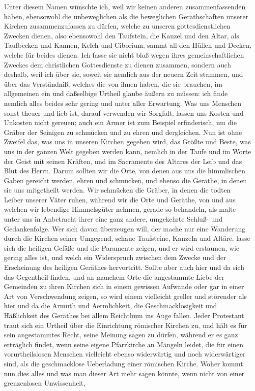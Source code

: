 Unter diesem Namen wünschte ich, weil wir keinen anderen zusammenfassenden haben, ebensowohl die unbeweglichen als die beweglichen Geräthschaften unserer Kirchen zusammenzufassen zu dürfen, welche zu unseren gottesdienstlichen Zwecken dienen, also ebensowohl den Taufstein, die Kanzel und den Altar, als Taufbecken und Kannen, Kelch und Ciborium, sammt all den Hüllen und Decken, welche für beides dienen. Ich fasse sie nicht bloß wegen ihres gemeinschaftlichen Zweckes dem christlichen Gottesdienste zu dienen zusammen, sondern auch deshalb, weil ich über sie, soweit sie nemlich aus der neuern Zeit stammen, und über das Verständniß, welches die von ihnen haben, die sie brauchen, im allgemeinen ein und daßselbige Urtheil glaube äußern zu müssen: ich finde nemlich alles beides sehr gering und unter aller Erwartung. Was uns Menschen sonst theuer und lieb ist, darauf verwenden wir Sorgfalt, lassen uns Kosten und Unkosten nicht gereuen; auch ein Armer ist zum Beispiel erfinderisch, um die Gräber der Seinigen zu schmücken und zu ehren und dergleichen. Nun ist ohne Zweifel das, was uns in unseren Kirchen gegeben wird, das Größte und Beste, was uns in der ganzen Welt gegeben werden kann, nemlich in der Taufe und im Worte der Geist mit seinen Kräften, und im Sacramente des Altares der Leib und das Blut des Herrn. Darum sollten wir die Orte, von denen aus uns die himmlischen Gaben gereicht werden, ehren
und schmücken, und ebenso die Geräthe, in denen sie uns mitgetheilt werden. Wir schmücken die Gräber, in denen die todten Leiber unserer Väter ruhen, während wir die Orte und Geräthe, von und aus welchen wir lebendige Himmelsgüter nehmen, gerade so behandeln, als malte unter uns in Anbetracht ihrer eine ganz andere, umgekehrte Schluß- und Gedankenfolge. Wer sich davon überzeugen will, der mache nur eine Wanderung durch die Kirchen seiner Umgegend, schaue Taufsteine, Kanzeln und Altäre, lasse sich die heiligen Gefäße und die Paramente zeigen, und er wird erstaunen, wie gering alles ist, und welch ein Widerspruch zwischen dem Zwecke und der Erscheinung des heiligen Geräthes hervortritt. Sollte aber auch hier und da sich das Gegentheil finden, und an manchem Orte die angestammte Liebe der Gemeinden zu ihren Kirchen sich in einem gewissen Aufwande oder gar in einer Art von Verschwendung zeigen, so wird einem vielleicht greller und störender als hier und da die Armuth und Aermlichkeit, die Geschmacklosigkeit und Häßlichkeit des Geräthes bei allem Reichthum ins Auge fallen. Jeder Protestant traut sich ein Urtheil über die Einrichtung römischer Kirchen zu, und hält es für sein angestammtes Recht, seine Meinung sagen zu dürfen, während er es ganz erträglich findet, wenn seine eigene Pfarrkirche an Mängeln leidet, die für einen vorurtheilslosen Menschen vielleicht ebenso widerwärtig und noch widerwärtiger sind, als die geschmacklose Ueberladung einer römischen Kirche. Woher kommt nun dies alles und was man dieser Art mehr sagen könnte, wenn nicht von einer grenzenlosen Unwissenheit,

